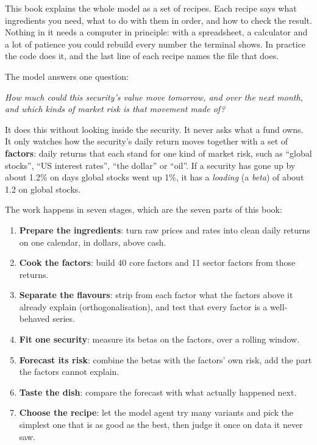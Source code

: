 \documentclass[11pt,a4paper]{article}
\begin{document}
This book explains the whole model as a set of recipes. Each recipe says what
ingredients you need, what to do with them in order, and how to check the result.
Nothing in it needs a computer in principle: with a spreadsheet, a calculator and a
lot of patience you could rebuild every number the terminal shows. In practice the
code does it, and the last line of each recipe names the file that does.

The model answers one question:

\begin{center}
\emph{How much could this security's value move tomorrow, and over the next month,\\
and which kinds of market risk is that movement made of?}
\end{center}

It does this without looking inside the security. It never asks what a fund owns.
It only watches how the security's daily return moves together with a set of
\textbf{factors}: daily returns that each stand for one kind of market risk, such
as ``global stocks'', ``US interest rates'', ``the dollar'' or ``oil''. If a
security has gone up by about 1.2\% on days global stocks went up 1\%, it has a
\emph{loading} (a \emph{beta}) of about 1.2 on global stocks.

The work happens in seven stages, which are the seven parts of this book:

\begin{enumerate}[leftmargin=2.2em]
  \item \textbf{Prepare the ingredients}: turn raw prices and rates into clean daily returns on one calendar, in dollars, above cash.
  \item \textbf{Cook the factors}: build 40 core factors and 11 sector factors from those returns.
  \item \textbf{Separate the flavours}: strip from each factor what the factors above it already explain (orthogonalisation), and test that every factor is a well-behaved series.
  \item \textbf{Fit one security}: measure its betas on the factors, over a rolling window.
  \item \textbf{Forecast its risk}: combine the betas with the factors' own risk, add the part the factors cannot explain.
  \item \textbf{Taste the dish}: compare the forecast with what actually happened next.
  \item \textbf{Choose the recipe}: let the model agent try many variants and pick the simplest one that is as good as the best, then judge it once on data it never saw.
\end{enumerate}
\end{document}

